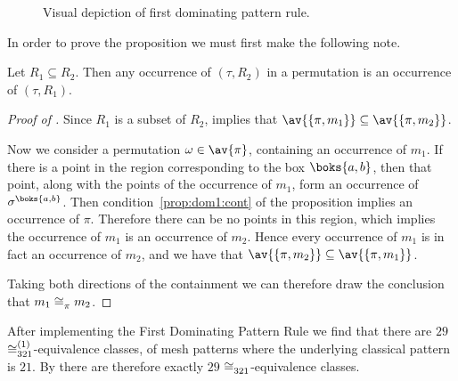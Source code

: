 \begin{figure}[htb]
    \begin{center}
        \raisebox{2ex}{\(\mapsto\)}

        \caption{Visual depiction of first dominating pattern rule.}
        \label{fig:rule1}
    \end{center}
\end{figure}

In order to prove the proposition we must first make the following note.

\begin{note}
    \label{not:downcmesh}
    Let \(R_1 \subseteq R_2\). Then any occurrence of \((\tau, R_2)\) in a permutation
    is an occurrence of \((\tau,R_1)\).
\end{note}

\begin{proof}[Proof of ]
    Since \(R_1\) is a subset of \(R_2\),  implies that
    \(\av{\{\pi,m_1\}} \subseteq \av{\{\pi,m_2\}}\).

    Now we consider a permutation \(\omega \in \av{\pi}\),
    containing an occurrence of \(m_1\). If there is a point in the
    region corresponding to the box \(\boks{a,b}\), then that point, along with the
    points of the occurrence of \(m_1\), form an occurrence of \(\sigma^\boks{a,b}\).
    Then condition~\eqref{prop:dom1:cont} of the
    proposition implies an occurrence of \(\pi\). Therefore there can be no
    points in this region, which implies the occurrence of \(m_1\) is an occurrence of \(m_2\). Hence every occurrence of
    \(m_1\) is in fact an occurrence of \(m_2\), and we have that
    \(\av{\{\pi,m_2\}} \subseteq \av{\{\pi,m_1\}}\).

    Taking both directions of the containment we can therefore draw the
    conclusion that \(m_1 \coinc{\pi} m_2\).
\end{proof}

After implementing the First Dominating Pattern Rule we find that there are
\(29\) \(\coinc[(1)]{321}\)-equivalence classes, of mesh patterns where the underlying
classical pattern is \(21\). By  there are
therefore exactly \(29\) \(\coinc{321}\)-equivalence classes.

